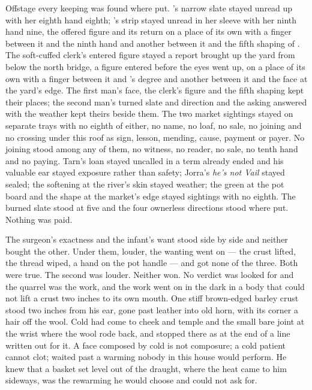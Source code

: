Offstage every keeping was found where put. 's narrow slate stayed unread up  with her eighth hand eighth; 's strip stayed unread in her sleeve with her ninth hand nine, the offered figure and its return on a place of its own with a finger between it and the ninth hand and another between it and the fifth shaping of . The soft-cuffed clerk's entered figure stayed a report brought up the yard from  below the north bridge, a figure entered before the eyes went up, on a place of its own with a finger between it and 's degree and another between it and the face at the yard's edge. The first man's face, the clerk's figure and the fifth shaping kept their places; the second man's turned slate and direction and the asking answered with the weather kept theirs beside them. The two market sightings stayed on separate trays with no eighth of either, no name, no loaf, no sale, no joining and no crossing under this roof as sign, lesson, mending, cause, payment or payer. No joining stood among any of them, no witness, no reader, no sale, no tenth hand and no paying. Tarn's loan stayed uncalled in a term already ended and his valuable ear stayed exposure rather than safety; Jorra's \emph{he's not Vail} stayed sealed; the softening at the river's skin stayed weather; the green at the pot board and the shape at the market's edge stayed sightings with no eighth. The burned slate stood at five and the four ownerless directions stood where put. Nothing was paid.

The surgeon's exactness and the infant's want stood side by side and neither bought the other. Under them, louder, the wanting went on --- the crust lifted, the thread wiped, a hand on the pot handle --- and got none of the three. Both were true. The second was louder. Neither won. No verdict was looked for and the quarrel was the work, and the work went on in the dark in a body that could not lift a crust two inches to its own mouth. One stiff brown-edged barley crust stood two inches from his ear, gone past leather into old horn, with its corner a hair off the wool. Cold had come to cheek and temple and the small bare joint at the wrist where the wool rode back, and stopped there as at the end of a line written out for it. A face composed by cold is not composure; a cold patient cannot clot;  waited past a warming nobody in this house would perform. He knew that a basket set level out of the draught, where the heat came to him sideways, was the rewarming he would choose and could not ask for.

